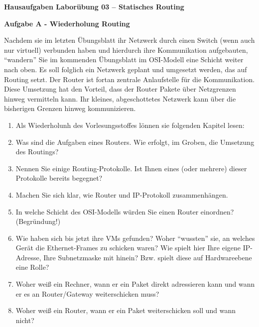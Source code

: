 \documentclass[paper=a4,fontsize=11pt]{scrartcl}%
\numberwithin{equation}{section}
\begin{document}
\begin{center}
\Large{\textbf{Hausaufgaben Laborübung 03 -- Statisches Routing}}
\end{center}
\begin{center}\Large{\textbf{Aufgabe A - Wiederholung Routing}}
\end{center}\vskip0.25in
Nachdem sie im letzten Übungsblatt ihr Netzwerk durch einen Switch (wenn auch nur virtuell) verbunden haben und hierdurch ihre Kommunikation aufgebauten, \enquote{wandern} Sie im kommenden Übungsblatt im OSI-Modell eine Schicht weiter nach oben. Es soll folglich ein Netzwerk geplant und umgesetzt werden, das auf Routing setzt. Der Router ist fortan zentrale Anlaufstelle für die Kommunikation. Diese Umsetzung hat den Vorteil, dass der Router Pakete über Netzgrenzen hinweg vermitteln kann. Ihr kleines, abgeschottetes Netzwerk kann über die bisherigen Grenzen hinweg kommunizieren.
\begin{enumerate}
	\item Als Wiederholunh des Vorlesungsstoffes lönnen sie folgenden Kapitel lesen: \cite[Kap. 4.1, 4.3]{Kurose2012}
	\item Was sind die Aufgaben eines Routers. Wie erfolgt, im Groben, die Umsetzung des Routings?
	\item Nennen Sie einige Routing-Protokolle. Ist Ihnen eines (oder mehrere) dieser Protokolle bereits begegnet?
	\item Machen Sie sich klar, wie Router und IP-Protokoll zusammenhängen.
	\item In welche Schicht des OSI-Modells würden Sie einen Router einordnen? (Begründung!)
	\item Wie haben sich bis jetzt ihre VMs gefunden? Woher \enquote{wussten} sie, an welches Gerät die Ethernet-Frames zu schicken waren? Wie spielt hier Ihre eigene IP-Adresse, Ihre Subnetzmaske mit hinein? Bzw. spielt diese auf Hardwareebene eine Rolle?
	\item Woher weiß ein Rechner, wann er ein Paket direkt adressieren kann und wann er es an Router/Gateway weiterschicken muss?
	\item Woher weiß ein Router, wann er ein Paket weiterschicken soll und wann nicht?
\end{enumerate}
\end{document}
